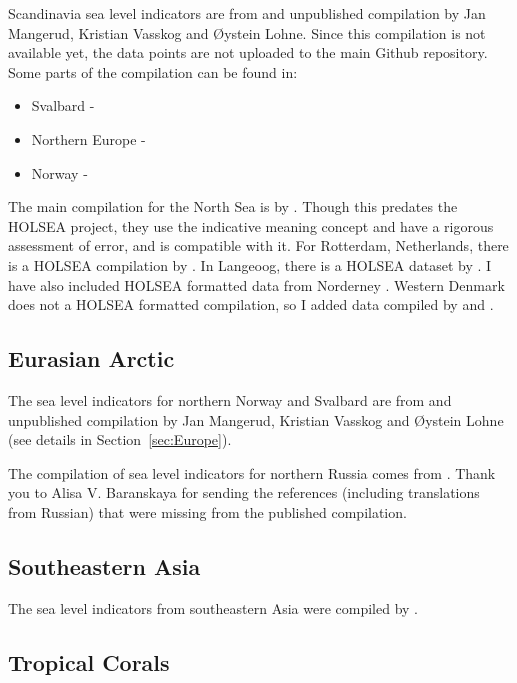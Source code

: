 Scandinavia sea level indicators are from and unpublished compilation by Jan Mangerud, Kristian Vasskog and \O{}ystein Lohne. Since this compilation is not available yet, the data points are not uploaded to the main Github repository. Some parts of the compilation can be found in:

\begin{itemize}
  \item Svalbard - \citet{BondevikEtal1995}
  \item Northern Europe - \citet{FormanEtal2004}
  \item Norway - \citet{LohneEtal2007,RomundsetEtal2010,RomundsetEtal2011,RomundsetEtal2015,RomundsetEtal2018,VasskogEtal2019}
\end{itemize}

The main compilation for the North Sea is by \citet{VinkEtal2007}. Though this predates the HOLSEA project, they use the indicative meaning concept and have a rigorous assessment of error, and is compatible with it. For Rotterdam, Netherlands, there is a HOLSEA compilation by \citet{HijmaCohen2019}. In Langeoog, there is a HOLSEA dataset by \citet{BungenstockEtal2021}. I have also included HOLSEA formatted data from Norderney \citep{SchederEtal2022}. Western Denmark does not a HOLSEA formatted compilation, so I added data compiled by \citet{GehrelsEtal2006} and \citet{JessenEtal2019}.


\subsection{Eurasian Arctic}

The sea level indicators for northern Norway and Svalbard are from and unpublished compilation by Jan Mangerud, Kristian Vasskog and \O{}ystein Lohne (see details in Section~\ref{sec:Europe}).

The compilation of sea level indicators for northern Russia comes from \citet{BaranskayaEtal2018}. Thank you to Alisa V. Baranskaya for sending the references (including translations from Russian) that were missing from the published compilation.

\subsection{Southeastern Asia}

The sea level indicators from southeastern Asia were compiled by \citet{MannEtal2019}.

\subsection{Tropical Corals}

